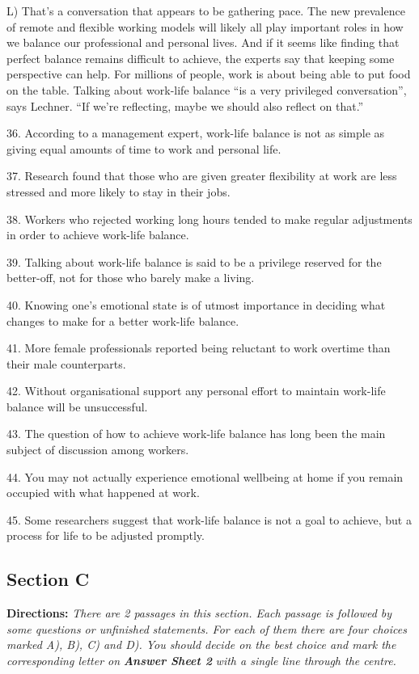 \documentclass[UTF8,11pt]{ctexart}
\begin{document}
L) That’s a conversation that appears to be gathering pace. The new prevalence of remote and flexible working models will likely all play important roles in how we balance our professional and personal lives. And if it seems like finding that perfect balance remains difficult to achieve, the experts say that keeping some perspective can help. For millions of people, work is about being able to put food on the table. Talking about work-life balance “is a very privileged conversation”, says Lechner. “If we’re reflecting, maybe we should also reflect on that.”


36. According to a management expert, work-life balance is not as simple as giving equal amounts of time to work and personal life.


37. Research found that those who are given greater flexibility at work are less stressed and more likely to stay in their jobs.


38. Workers who rejected working long hours tended to make regular adjustments in order to achieve work-life balance.


39. Talking about work-life balance is said to be a privilege reserved for the better-off, not for those who barely make a living.


40. Knowing one’s emotional state is of utmost importance in deciding what changes to make for a better work-life balance.


41. More female professionals reported being reluctant to work overtime than their male counterparts.


42. Without organisational support any personal effort to maintain work-life balance will be unsuccessful.


43. The question of how to achieve work-life balance has long been the main subject of discussion among workers.


44. You may not actually experience emotional wellbeing at home if you remain occupied with what happened at work.


45. Some researchers suggest that work-life balance is not a goal to achieve, but a process for life to be adjusted promptly.


\subsection*{\textbf{Section C}}


\textbf{Directions: }\textit{There are 2 passages in this section. Each passage is followed by some questions or unfinished} \textit{statements. For each of them there are four choices marked A), B), C) and D). You should decide on the best} \textit{choice and mark the corresponding letter on }\textbf{\textit{Answer Sheet 2}}\textit{ with a single line through the centre.}
\end{document}
